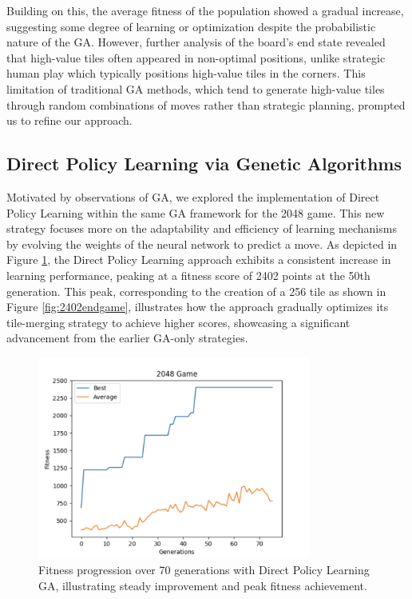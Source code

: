 \documentclass[11pt]{article}
\begin{document}
Building on this, the average fitness of the population showed a gradual increase, suggesting some degree of learning or optimization despite the probabilistic nature of the GA. However, further analysis of the board's end state revealed that high-value tiles often appeared in non-optimal positions, unlike strategic human play which typically positions high-value tiles in the corners. This limitation of traditional GA methods, which tend to generate high-value tiles through random combinations of moves rather than strategic planning, prompted us to refine our approach.

\newpage
\subsection{Direct Policy Learning via Genetic Algorithms}
Motivated by observations of GA, we explored the implementation of Direct Policy Learning within the same GA framework for the 2048 game. This new strategy focuses more on the adaptability and efficiency of learning mechanisms by evolving the weights of the neural network to predict a move. As depicted in Figure \ref{fig:results}, the Direct Policy Learning approach exhibits a consistent increase in learning performance, peaking at a fitness score of 2402 points at the 50th generation. This peak, corresponding to the creation of a 256 tile as shown in Figure \ref{fig:2402endgame}, illustrates how the approach gradually optimizes its tile-merging strategy to achieve higher scores, showcasing a significant advancement from the earlier GA-only strategies.

\begin{figure}[ht]
\centering
\includegraphics[width=0.8\textwidth]{2402.png}
\caption{Fitness progression over 70 generations with Direct Policy Learning GA, illustrating steady improvement and peak fitness achievement.}
\label{fig:results}
\end{figure}
\end{document}
